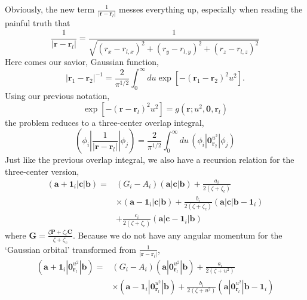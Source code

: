 \documentclass[12pt,a4paper,openany,twoside]{article}
\numberwithin{equation}{section}
\begin{document}
Obviously, the new term $\frac{1}{|\boldsymbol{r} - \boldsymbol{r}_l|}$ messes everything up, especially when reading the painful truth that
\begin{equation}
    \frac{1}{|\boldsymbol{r} - \boldsymbol{r}_l| } = \frac{1}{\sqrt{(r_x - r_{l,x})^2 + (r_{y} - r_{l,y})^2 + (r_{z} - r_{l,z})^2}}
\end{equation}
Here comes our savior, Gaussian function,
\begin{equation}
    \left|\boldsymbol{r}_{1}-\boldsymbol{r}_{2}\right|^{-1}=\frac{2}{\pi^{1 / 2}} \int_{0}^{\infty} d u \exp \left[-\left(\boldsymbol{r}_{1}-\boldsymbol{r}_{2}\right)^{2} u^{2}\right].
\end{equation}
Using our previous notation,
\begin{equation}
    \exp \left[-\left(\boldsymbol{r}-\boldsymbol{r}_{l}\right)^{2} u^{2}\right] = g(\boldsymbol{r};u^2,\boldsymbol{0},\boldsymbol{r}_l)
\end{equation}
the problem reduces to a three-center overlap integral,
\begin{equation}
    ( \phi_i | \frac{1}{|\boldsymbol{r} - \boldsymbol{r}_l|} |\phi_j ) = \frac{2}{\pi^{1 / 2}} \int_0^\infty du \, (\phi_i|\boldsymbol{0}_{\boldsymbol{r}_2}^{u^2}|\phi_j)
\end{equation}
Just like the previous overlap integral, we also have a recursion relation for the three-center version,
\begin{equation}
\begin{aligned}
    \left(\boldsymbol{a}+\boldsymbol{1}_{i}|\boldsymbol{c}| \boldsymbol{b}\right)=&\left(G_{i}-A_{i}\right)(\boldsymbol{a}|\boldsymbol{c}| \boldsymbol{b})+\frac{a_i}{2\left(\zeta+\zeta_{c}\right)} \\
& \times \left(\boldsymbol{a}-\boldsymbol{1}_{i}|\boldsymbol{c}| \boldsymbol{b}\right)+\frac{ b_i}{2\left(\zeta+\zeta_{c}\right)} \left(\boldsymbol{a} | \boldsymbol{c}|\boldsymbol{b}-\boldsymbol{1}_{i}\right)\\
&+\frac{c_i}{2\left(\zeta+\zeta_{c}\right)}\left(\boldsymbol{a}\left|\boldsymbol{c}-\boldsymbol{1}_{i}\right| \boldsymbol{b}\right)
\end{aligned}
\end{equation}
where $\boldsymbol{G}=\frac{\zeta \boldsymbol{P}+\zeta_{c} \boldsymbol{C}}{\zeta+\zeta_{c}}$. Because we do not have any angular momentum for the `Gaussian orbital' transformed from $\frac{1}{|\boldsymbol{r} - \boldsymbol{r}_l| }$,
\begin{equation}
    \begin{aligned}
    \left(\boldsymbol{a}+\boldsymbol{1}_{i}|\boldsymbol{0}_{\boldsymbol{r}_l}^{u^2}| \boldsymbol{b}\right)= & \left(G_{i}-A_{i}\right)(\boldsymbol{a}|\boldsymbol{0}_{\boldsymbol{r}_l}^{u^2}| \boldsymbol{b})+\frac{a_i}{2\left(\zeta + u^2\right)} \\
    & \times \left(\boldsymbol{a}-\boldsymbol{1}_{i}|\boldsymbol{0}_{\boldsymbol{r}_l}^{u^2}| \boldsymbol{b}\right)+\frac{ b_i}{2\left(\zeta + u^2\right)} \left(\boldsymbol{a} | \boldsymbol{0}_{\boldsymbol{r}_l}^{u^2}|\boldsymbol{b}-\boldsymbol{1}_{i}\right)
    \end{aligned}
\end{equation}
\end{document}
